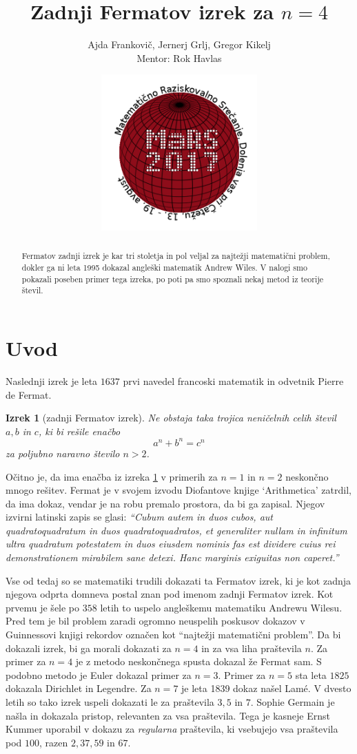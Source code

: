 \documentclass[12pt, a4paper]{article}
\title{Zadnji Fermatov izrek za $n=4$}
\author{Ajda Frankovič, Jernerj Grlj, Gregor Kikelj \\ Mentor: Rok Havlas}
\date{\includegraphics[width = 6cm]{logo_MaRS2017.png}}
\newtheorem{izrek}{Izrek}
\begin{document}
\maketitle

\begin{abstract}
Fermatov zadnji izrek je kar tri stoletja in pol veljal za najtežji matematični problem, dokler ga ni leta 1995 dokazal angleški matematik Andrew Wiles. V nalogi smo pokazali poseben primer tega izreka, po poti pa smo spoznali nekaj metod iz teorije števil.
\end{abstract}

\section{Uvod}


Naslednji izrek je leta $1637$ prvi navedel francoski matematik in odvetnik Pierre de Fermat.


\begin{izrek}[zadnji Fermatov izrek]\label{fermat}
Ne obstaja taka trojica neničelnih celih števil $a, b$ in $c$, ki bi rešile enačbo $$a^n+b^n=c^n$$ za poljubno naravno število $n > 2$. 
\end{izrek}

Očitno je, da ima enačba iz izreka \ref{fermat} v primerih za $n=1$ in $n=2$ neskončno mnogo rešitev. Fermat je v svojem izvodu Diofantove knjige `Arithmetica' zatrdil, da ima dokaz, vendar je na robu premalo prostora, da bi ga zapisal. Njegov izvirni latinski zapis se glasi: \textit{``Cubum autem in duos cubos, aut quadratoquadratum in duos quadratoquadratos, et generaliter nullam in infinitum ultra quadratum potestatem in duos eiusdem nominis fas est dividere cuius rei demonstrationem mirabilem sane detexi. Hanc marginis exiguitas non caperet.''}

Vse od tedaj so se matematiki trudili dokazati ta Fermatov izrek, ki je kot zadnja njegova odprta domneva postal znan pod imenom zadnji Fermatov izrek. Kot prvemu je šele po $358$ letih to uspelo angleškemu matematiku Andrewu Wilesu. Pred tem je bil problem zaradi ogromno neuspelih poskusov dokazov  v Guinnessovi knjigi rekordov označen kot ``najtežji matematični problem''. Da bi dokazali izrek, bi ga morali dokazati za $n=4$ in za vsa liha praštevila $n$. Za primer za $n=4$ je z metodo neskončnega spusta dokazal že Fermat sam. S podobno metodo je Euler dokazal primer za $n=3$. Primer za $n=5$ sta leta $1825$ dokazala Dirichlet in Legendre. Za $n=7$ je leta 1839 dokaz našel Lamé. V dvesto letih so tako izrek uspeli dokazati le za praštevila $3, 5$ in $7$. Sophie Germain je našla in dokazala pristop, relevanten za vsa praštevila. Tega je kasneje Ernst Kummer uporabil v dokazu za \textit{regularna} praštevila, ki vsebujejo vsa praštevila pod $100$, razen $2, 37, 59$ in $67$.
\end{document}
